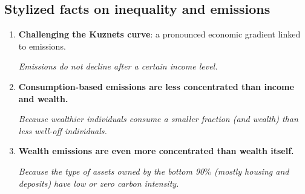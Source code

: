 \documentclass[10pt]{beamer}
\begin{document}
\subsection{Stylized facts on inequality and emissions}
\begin{frame}{\subsecname}

    \begin{enumerate}
        \item \textbf{Challenging the Kuznets curve}: a pronounced economic gradient linked to emissions.

            \textit{Emissions do not decline after a certain income level.}
            \vspace{5pt}

        \item \textbf{Consumption-based emissions are less concentrated than income and wealth.}
        
            \textit{Because wealthier individuals consume a smaller fraction (and wealth) than less well-off individuals.}
            \vspace{5pt}

        \item \textbf{Wealth emissions are even more concentrated than wealth itself.}
        
            \textit{Because the type of assets owned by the bottom 90$\%$ (mostly housing and deposits) have low or zero carbon intensity.}
            \vspace{5pt}

    \end{enumerate}

\end{frame}
\end{document}

